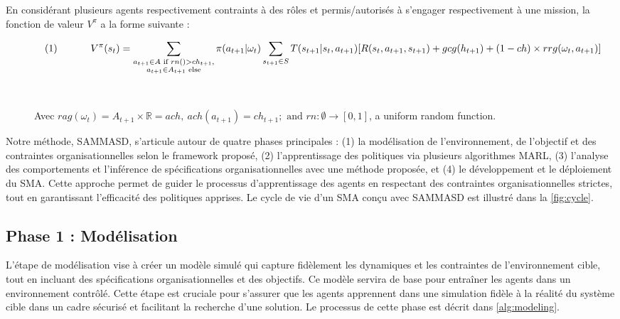 \documentclass[sigconf,anonymous]{aamas}
\begin{document}
En considérant plusieurs agents respectivement contraints à des rôles et permis/autorisés à s'engager respectivement à une mission, la fonction de valeur $V^\pi$ a la forme suivante :

\begin{figure*}

  \begin{gather*}
    \text{\quad (1) \quad \qquad }V^\pi(s_t) = \sum_{\substack{a_{t+1} \in A \text{ if } rn() > ch_{t+1}, \\ 
    a_{t+1} \in A_{t+1} \text{ else}
    }}{\pi(a_{t+1} | \omega_t)} \sum_{s_{t+1} \in S}{T(s_{t+1} | s_t, a_{t+1})[R(s_t,a_{t+1},s_{t+1}) + gcg(h_{t+1}) + (1-ch) \times rrg(\omega_t,a_{t+1})]}
  \end{gather*}
  
  \
  
  Avec $rag(\omega_t) = A_{t+1} \times \mathbb{R} = ach, \ ach(a_{t+1}) = ch_{t+1} ; \text{ and } rn: \emptyset \to [0,1]$, a uniform random function.
  \end{figure*}

Notre méthode, SAMMASD, s'articule autour de quatre phases principales : (1) la modélisation de l'environnement, de l'objectif et des contraintes organisationnelles selon le framework proposé, (2) l'apprentissage des politiques via plusieurs algorithmes MARL, (3) l'analyse des comportements et l'inférence de spécifications organisationnelles avec une méthode proposée, et (4) le développement et le déploiement du SMA. Cette approche permet de guider le processus d'apprentissage des agents en respectant des contraintes organisationnelles strictes, tout en garantissant l'efficacité des politiques apprises. Le cycle de vie d'un SMA conçu avec SAMMASD est illustré dans la \autoref{fig:cycle}.


\subsection{Phase 1 : Modélisation}

L'étape de modélisation vise à créer un modèle simulé qui capture fidèlement les dynamiques et les contraintes de l'environnement cible, tout en incluant des spécifications organisationnelles et des objectifs. Ce modèle servira de base pour entraîner les agents dans un environnement contrôlé. Cette étape est cruciale pour s'assurer que les agents apprennent dans une simulation fidèle à la réalité du système cible dans un cadre sécurisé et facilitant la recherche d'une solution. Le processus de cette phase est décrit dans \autoref{alg:modeling}.
\end{document}
